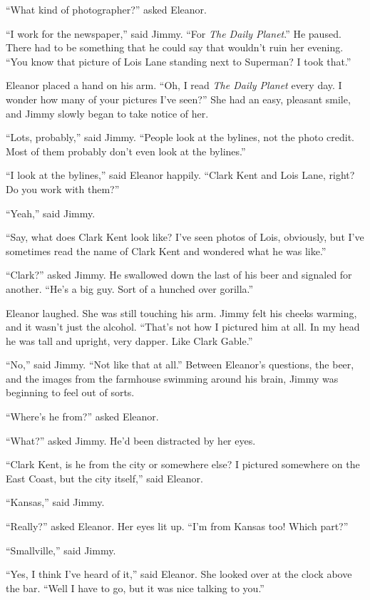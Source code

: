 ``What kind of photographer?'' asked Eleanor.

``I work for the newspaper,'' said Jimmy. ``For \emph{The Daily
Planet}.'' He paused. There had to be something that he could say that
wouldn't ruin her evening. ``You know that picture of Lois Lane standing
next to Superman? I took that.''

Eleanor placed a hand on his arm. ``Oh, I read \emph{The Daily Planet}
every day. I wonder how many of your pictures I've seen?'' She had an
easy, pleasant smile, and Jimmy slowly began to take notice of her.

``Lots, probably,'' said Jimmy. ``People look at the bylines, not the
photo credit. Most of them probably don't even look at the bylines.''

``I look at the bylines,'' said Eleanor happily. ``Clark Kent and Lois
Lane, right? Do you work with them?''

``Yeah,'' said Jimmy.

``Say, what does Clark Kent look like? I've seen photos of Lois,
obviously, but I've sometimes read the name of Clark Kent and wondered
what he was like.''

``Clark?'' asked Jimmy. He swallowed down the last of his beer and
signaled for another. ``He's a big guy. Sort of a hunched over
gorilla.''

Eleanor laughed. She was still touching his arm. Jimmy felt his cheeks
warming, and it wasn't just the alcohol. ``That's not how I pictured him
at all. In my head he was tall and upright, very dapper. Like Clark
Gable.''

``No,'' said Jimmy. ``Not like that at all.'' Between Eleanor's
questions, the beer, and the images from the farmhouse swimming around
his brain, Jimmy was beginning to feel out of sorts.

``Where's he from?'' asked Eleanor.

``What?'' asked Jimmy. He'd been distracted by her eyes.

``Clark Kent, is he from the city or somewhere else? I pictured
somewhere on the East Coast, but the city itself,'' said Eleanor.

``Kansas,'' said Jimmy.

``Really?'' asked Eleanor. Her eyes lit up. ``I'm from Kansas too! Which
part?''

``Smallville,'' said Jimmy.

``Yes, I think I've heard of it,'' said Eleanor. She looked over at the
clock above the bar. ``Well I have to go, but it was nice talking to
you.''

